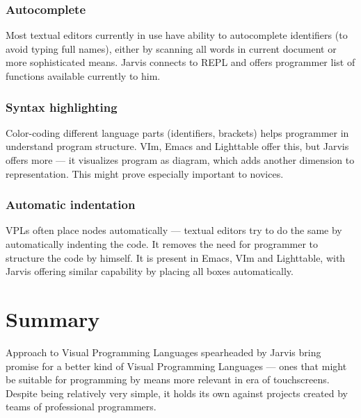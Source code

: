\documentclass[11pt]{scrartcl}
\begin{document}
\subsubsection*{Autocomplete}
Most textual editors currently in use have ability to autocomplete identifiers
(to avoid typing full names), either by scanning all words in current document
or more sophisticated means. Jarvis connects to REPL and offers programmer list
of functions available currently to him.
    
\subsubsection*{Syntax highlighting}
Color-coding different language parts (identifiers, brackets) helps programmer
in understand program structure. VIm, Emacs and Lighttable offer this, but
Jarvis offers more --- it visualizes program as diagram, which adds another
dimension to representation. This might prove especially important to novices.
    
\subsubsection*{Automatic indentation}
VPLs often place nodes automatically --- textual editors try to do the same by
automatically indenting the code. It removes the need for programmer to
structure the code by himself. It is present in Emacs, VIm and Lighttable, with
Jarvis offering similar capability by placing all boxes automatically.

\section{Summary}
Approach to Visual Programming Languages spearheaded by Jarvis bring promise for
a better kind of Visual Programming Languages --- ones that might be suitable for
programming by means more relevant in era of touchscreens. Despite being
relatively very simple, it holds its own against projects created by teams of
professional programmers.




\end{document}
